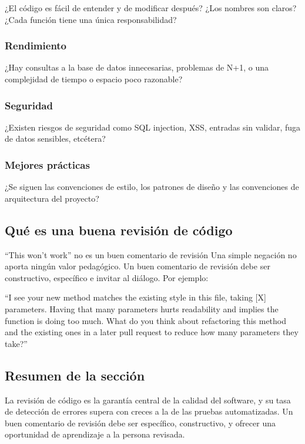 ¿El código es fácil de entender y de modificar después? ¿Los nombres son claros? ¿Cada función tiene una única responsabilidad?

\subsubsection{Rendimiento}

¿Hay consultas a la base de datos innecesarias, problemas de N+1, o una complejidad de tiempo o espacio poco razonable?

\subsubsection{Seguridad}

¿Existen riesgos de seguridad como SQL injection, XSS, entradas sin validar, fuga de datos sensibles, etcétera?

\subsubsection{Mejores prácticas}

¿Se siguen las convenciones de estilo, los patrones de diseño y las convenciones de arquitectura del proyecto?

\subsection{Qué es una buena revisión de código}

\begin{warningbox}{``This won't work'' no es un buen comentario de revisión}
Una simple negación no aporta ningún valor pedagógico. Un buen comentario de revisión debe ser constructivo, específico e invitar al diálogo. Por ejemplo:

``I see your new method matches the existing style in this file, taking {[}X{]} parameters. Having that many parameters hurts readability and implies the function is doing too much. What do you think about refactoring this method and the existing ones in a later pull request to reduce how many parameters they take?''
\end{warningbox}

\subsection{Resumen de la sección}

La revisión de código es la garantía central de la calidad del software, y su tasa de detección de errores supera con creces a la de las pruebas automatizadas. Un buen comentario de revisión debe ser específico, constructivo, y ofrecer una oportunidad de aprendizaje a la persona revisada.

